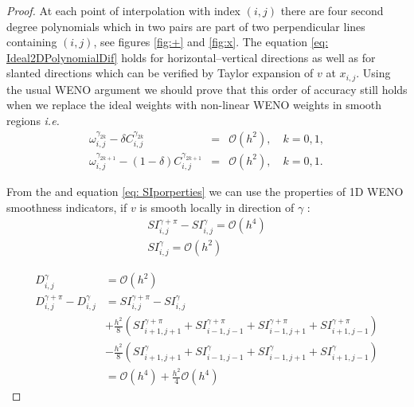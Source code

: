 \begin{proof}
At each point of interpolation with index $(i,j)$ there are four second degree polynomials which in two pairs are part of two perpendicular lines containing $(i,j)$, see figures \ref{fig:+} and  \ref{fig:x}. %
The equation \eqref{eq: Ideal2DPolynomialDif} holds for horizontal--vertical directions as well as for slanted directions which can be verified by Taylor expansion of $v$  at $x_{i,j}$. Using the usual WENO argument we should prove that this order of accuracy still holds  when we replace the ideal weights with non-linear WENO weights in smooth regions {\sl i.e.} 
{\setlength\arraycolsep{2pt}
\begin{eqnarray*}
\omega_{i,j}^{\gamma_{2k}}-\delta C_{i,j}^{\gamma_{2k}} & = & \mathcal{O}(h^2), \quad k=0,1, \\
\omega_{i,j}^{\gamma_{2k+1}}-(1-\delta) C_{i,j}^{\gamma_{2k+1}} & = & \mathcal{O}(h^2), \quad k=0,1.
\end{eqnarray*}}%


From the \cite{Liu2009,ARANDIGA2012} and equation \eqref{eq: SIporperties} we can use the properties of 1D WENO smoothness indicators, if $v$ is smooth locally in direction of $\gamma$ :
\begin{equation}
\begin{aligned}\label{eq: SmoothnesOrder}
	SI^{\gamma+\pi}_{i, j}-SI^\gamma_{i, j}= \mathcal{O}\left(h^4\right)\\
	SI^\gamma_{i, j}=\mathcal{O}\left(h^2\right)
\end{aligned}
\end{equation}

\begin{equation}\label{eq: DDiffOrder}
\begin{aligned}
	D^\gamma_{i, j}&=\mathcal{O}\left(h^2\right)\\
	D^{\gamma+\pi}_{i, j}-D^\gamma_{i, j}&= SI^{\gamma+\pi}_{i, j}-SI^\gamma_{i, j}\\
&+\frac{h^2}{8}(SI_{i+1,j+1}^{\gamma+\pi}+SI_{i-1,j-1}^{\gamma+\pi}+SI_{i-1,j+1}^{\gamma+\pi}+SI_{i+1,j-1}^{\gamma+\pi})\\
&-\frac{h^2}{8}(SI_{i+1,j+1}^\gamma+SI_{i-1,j-1}^\gamma+SI_{i-1,j+1}^\gamma+SI_{i+1,j-1}^\gamma)\\
&=\mathcal{O}\left(h^4\right)+ \frac{h^2}{4}\mathcal{O}\left(h^4\right)
\end{aligned}
\end{equation}



\end{proof}
